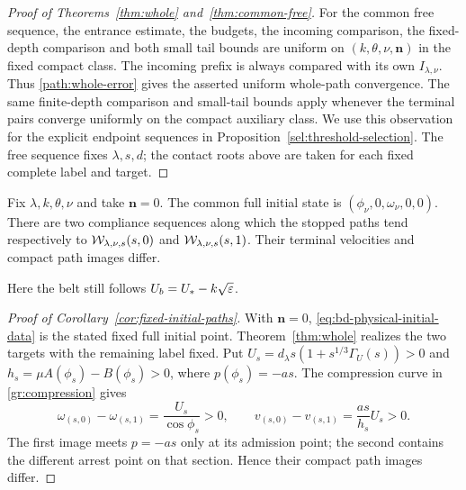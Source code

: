 \begin{proof}[Proof of Theorems~\ref{thm:whole} and~\ref{thm:common-free}]
For the common free sequence, the entrance estimate, the budgets,
the incoming comparison, the fixed-depth comparison and both small
tail bounds are uniform on $(k,\theta,\nu,\mathbf n)$ in the fixed
compact class.  The incoming prefix is always compared with its
own $I_{\lambda,\nu}$.  Thus \eqref{path:whole-error} gives the
asserted uniform whole-path convergence. The same finite-depth
comparison and small-tail bounds apply whenever the terminal pairs
converge uniformly on the compact auxiliary class. We use this
observation for the explicit endpoint sequences in
Proposition~\ref{sel:threshold-selection}. The free sequence fixes
$\lambda,s,d$; the contact roots above are taken for each fixed
complete label and target.
\end{proof}



\begin{corollary}
\label{cor:fixed-initial-paths}
Fix $\lambda,k,\theta,\nu$ and take $\mathbf n=0$. The common full
initial state is $(\phi_\nu,0,\omega_\nu,0,0)$. There are two
compliance sequences along which the stopped paths tend respectively
to $\mathcal W_{\lambda,\nu,s}(s,0)$ and
$\mathcal W_{\lambda,\nu,s}(s,1)$. Their terminal velocities and compact
path images differ.
\end{corollary}

Here the belt still follows $U_b=U_*-k\sqrt{\varepsilon}$.

\begin{proof}[Proof of Corollary~\ref{cor:fixed-initial-paths}]
With $\mathbf n=0$, \eqref{eq:bd-physical-initial-data} is the stated
fixed full initial point. Theorem~\ref{thm:whole} realizes the two
targets with the remaining label fixed. Put
$U_s=d_\lambda s(1+s^{1/3}\Gamma_U(s))>0$ and
$h_s=\mu A(\phi_s)-B(\phi_s)>0$, where $p(\phi_s)=-as$.
The compression curve in \eqref{gr:compression} gives
\[
 \omega_{(s,0)}-\omega_{(s,1)}=\frac{U_s}{\cos\phi_s}>0,
 \qquad
 v_{(s,0)}-v_{(s,1)}=\frac{as}{h_s}U_s>0.
\]
The first image meets $p=-as$ only at its admission point; the second
contains the different arrest point on that section. Hence their
compact path images differ.
\end{proof}
